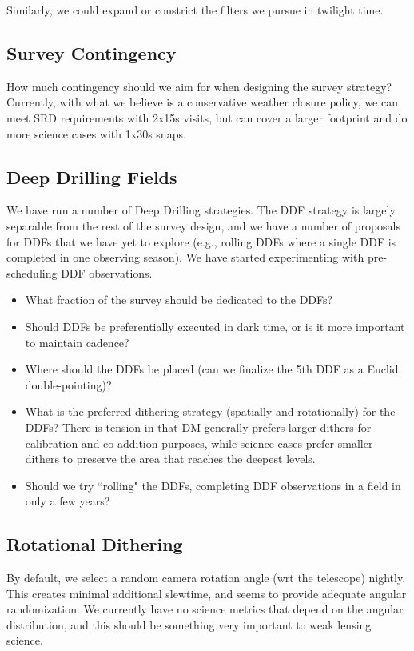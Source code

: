 Similarly, we could expand or constrict the filters we pursue in twilight time. 

\subsection{Survey Contingency}

How much contingency should we aim for when designing the survey strategy?  Currently, with what we believe is a conservative weather closure policy, we can meet SRD requirements with 2x15s visits, but can cover a larger footprint and do more science cases with 1x30s snaps.  

\subsection{Deep Drilling Fields}

We have run a number of Deep Drilling strategies. The DDF strategy is largely separable from the rest of the survey design, and we have a number of proposals for DDFs that we have yet to explore (e.g., rolling DDFs where a single DDF is completed in one observing season).  We have started experimenting with pre-scheduling DDF observations. 

\begin{itemize}
    \item{What fraction of the survey should be dedicated to the DDFs?}
    \item{Should DDFs be preferentially executed in dark time, or is it more important to maintain cadence?}
    \item{Where should the DDFs be placed (can we finalize the 5th DDF as a Euclid double-pointing)?}
    \item{What is the preferred dithering strategy (spatially and rotationally) for the DDFs? There is tension in that DM generally prefers larger dithers for calibration and co-addition purposes, while science cases prefer smaller dithers to preserve the area that reaches the deepest levels.}
    \item{Should we try ``rolling" the DDFs, completing DDF observations in a field in only a few years?}
\end{itemize}

\subsection{Rotational Dithering}

By default, we select a random camera rotation angle (wrt the telescope) nightly. This creates minimal additional slewtime, and seems to provide adequate angular randomization.  We currently have no science metrics that depend on the angular distribution, and this should be something very important to weak lensing science.

